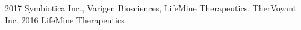 

\begin{cvhonors}
  \cvhonor
    {2017} %
    {Symbiotica Inc., Varigen Biosciences, LifeMine Therapeutics, TherVoyant Inc.} %
    {} %
  \cvhonor
    {2016} %
    {LifeMine Therapeutics} %
    {} %
\end{cvhonors}